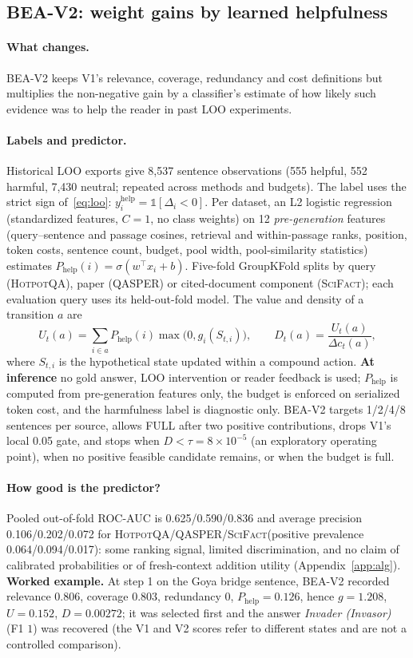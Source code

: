 \documentclass[10pt,twocolumn,letterpaper]{article}
\newcommand{\vtwo}{\textsc{BEA-V2}\xspace}
\newcommand{\hotpot}{\textsc{HotpotQA}\xspace}
\newcommand{\qasper}{\textsc{QASPER}\xspace}
\newcommand{\scifact}{\textsc{SciFact}\xspace}
\newcommand{\Phelp}{P_{\mathrm{help}}}
\begin{document}
\subsection{BEA-V2: weight gains by learned helpfulness}
\paragraph{What changes.} \vtwo keeps V1's relevance, coverage, redundancy and cost definitions but multiplies the non-negative gain by a classifier's estimate of how likely such evidence was to help the reader in past LOO experiments.

\paragraph{Labels and predictor.} Historical LOO exports give 8,537 sentence observations (555 helpful, 552 harmful, 7,430 neutral; repeated across methods and budgets). The label uses the strict sign of~\eqref{eq:loo}: $y^{\mathrm{help}}_i=\mathbb 1[\Delta_i<0]$. Per dataset, an L2 logistic regression (standardized features, $C{=}1$, no class weights) on 12 \emph{pre-generation} features (query--sentence and passage cosines, retrieval and within-passage ranks, position, token costs, sentence count, budget, pool width, pool-similarity statistics) estimates $\Phelp(i)=\sigma(w^\top x_i+b)$. Five-fold GroupKFold splits by query (\hotpot), paper (\qasper) or cited-document component (\scifact); each evaluation query uses its held-out-fold model. The value and density of a transition $a$ are
\begin{equation}
U_t(a)=\sum_{i\in a}\Phelp(i)\max\bigl(0,g_i(S_{t,i})\bigr),\qquad D_t(a)=\frac{U_t(a)}{\Delta c_t(a)},\label{eq:v2}
\end{equation}
where $S_{t,i}$ is the hypothetical state updated within a compound action. \textbf{At inference} no gold answer, LOO intervention or reader feedback is used; $\Phelp$ is computed from pre-generation features only, the budget is enforced on serialized token cost, and the harmfulness label is diagnostic only. \vtwo targets 1/2/4/8 sentences per source, allows FULL after two positive contributions, drops V1's local 0.05 gate, and stops when $D<\tau{=}8{\times}10^{-5}$ (an exploratory operating point), when no positive feasible candidate remains, or when the budget is full.

\paragraph{How good is the predictor?} Pooled out-of-fold ROC-AUC is 0.625/0.590/0.836 and average precision 0.106/0.202/0.072 for \hotpot/\qasper/\scifact (positive prevalence 0.064/0.094/0.017): some ranking signal, limited discrimination, and no claim of calibrated probabilities or of fresh-context addition utility (Appendix~\ref{app:alg}). \textbf{Worked example.} At step 1 on the Goya bridge sentence, \vtwo recorded relevance $0.806$, coverage $0.803$, redundancy $0$, $\Phelp{=}0.126$, hence $g{=}1.208$, $U{=}0.152$, $D{=}0.00272$; it was selected first and the answer \emph{Invader (Invasor)} (F1 $1$) was recovered (the V1 and V2 scores refer to different states and are not a controlled comparison).
\end{document}
